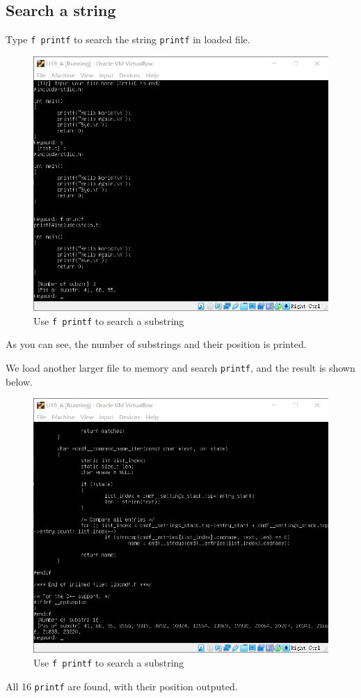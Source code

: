 \documentclass[cn,black,12pt,normal]{elegantnote}
\begin{document}
\subsection{Search a string}

Type \lstinline{f printf} to search the string \lstinline{printf} in loaded file.

\begin{figure}[H]
    \centering
    \includegraphics[width=0.6\linewidth]{image/kmp_04.jpg}
    \caption{Use \lstinline{f printf} to search a substring}
\end{figure}

As you can see, the number of substrings and their position is printed.

We load another larger file to memory and search \lstinline{printf}, and the result is shown below.

\begin{figure}[H]
    \centering
    \includegraphics[width=0.6\linewidth]{image/kmp_05.jpg}
    \caption{Use \lstinline{f printf} to search a substring}
\end{figure}

All 16 \lstinline{printf} are found, with their position outputed.
\end{document}
